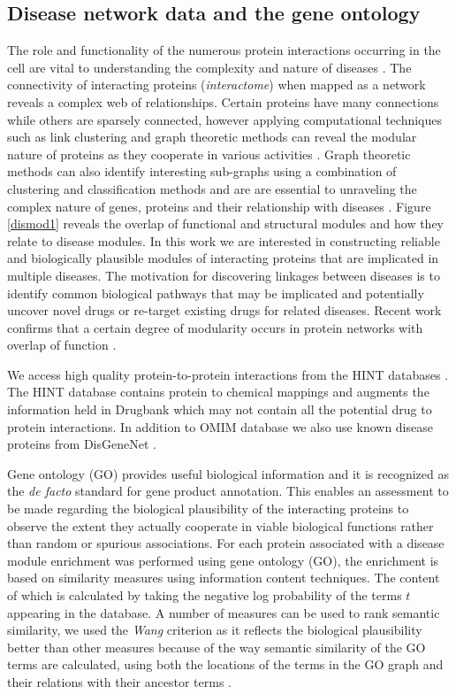 \documentclass[a4paper,8pt,twocolumn,5p]{elsarticle}
\begin{document}
\subsection{Disease network data and the gene ontology}
The role and functionality of the numerous protein interactions occurring in the cell are vital to understanding the complexity and nature of diseases \citep{Menche2015}. The connectivity of interacting proteins ({\it interactome})  when mapped as a network reveals a complex web of relationships. Certain proteins have many connections while others are sparsely connected, however applying computational techniques such as link clustering and graph theoretic methods can reveal the modular nature of proteins as they cooperate in various activities \citep{McGarry2018a}. Graph theoretic methods can also identify interesting sub-graphs using a combination of clustering and classification methods and are are essential to unraveling the complex nature of genes, proteins and their relationship with diseases \citep{Ghiassian2015}. Figure \ref{dismod1} reveals the overlap of functional and structural modules and how they relate to disease modules. In this work we are interested in constructing reliable and biologically plausible modules of interacting proteins that are implicated in multiple diseases. The motivation for discovering linkages between diseases is to identify common biological pathways that may be implicated and potentially uncover novel drugs or re-target existing drugs for related diseases. Recent work confirms that a certain degree of modularity occurs in protein networks with overlap of function \citep{McGarry2013}. 

We  access high quality protein-to-protein interactions from the HINT  databases \cite{Kuhn2012}.  The HINT database contains protein to chemical mappings and augments the information held in Drugbank which may not contain all the potential drug to protein interactions. In addition to OMIM database we also use known disease proteins from DisGeneNet \cite{Pinero2015}.

Gene ontology (GO) provides useful biological information and it is recognized as the {\it de facto} standard for gene product annotation. This enables an assessment to be made regarding the biological plausibility of the interacting proteins to observe the extent they actually cooperate in viable biological functions rather than random or spurious associations. For each protein associated with a disease module enrichment was performed using gene ontology (GO), the enrichment is based on similarity measures using information content techniques. The content of which is calculated by taking the negative log probability of the terms $t$ appearing in the database. A number of measures can be used to rank semantic similarity, we used the {\it Wang} criterion as it reflects the biological plausibility better than other measures because of the way semantic similarity of the GO terms are calculated, using both the locations of the terms in the GO graph and their relations with their ancestor terms \cite{Wang2007}.
\end{document}
